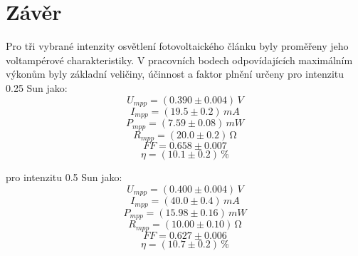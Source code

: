 \documentclass{../concepts/prepareprotokol} %
\begin{document}
\section{Závěr}

Pro tři vybrané intenzity osvětlení fotovoltaického článku byly proměřeny jeho voltampérové charakteristiky. V pracovních bodech odpovídajících maximálním výkonům byly základní veličiny, účinnost a faktor plnění určeny pro intenzitu 0.25 Sun jako:
\begin{equation*}
    U_{mpp} = (0.390 \pm 0.004) \, \si{V}
\end{equation*}
\begin{equation*}
    I_{mpp} = (19.5 \pm 0.2) \, \si{mA}
\end{equation*}
\begin{equation*}
    P_{mpp} = (7.59 \pm 0.08) \, \si{mW}
\end{equation*}
\begin{equation*}
    R_{mpp} = (20.0 \pm 0.2) \, \si{\ohm}
\end{equation*}
\begin{equation*}
    FF = 0.658 \pm 0.007
\end{equation*}
\begin{equation*}
    \eta = (10.1 \pm 0.2)\,\%
\end{equation*}

pro intenzitu 0.5 Sun jako:
\begin{equation*}
    U_{mpp} = (0.400 \pm 0.004) \, \si{V}
\end{equation*}
\begin{equation*}
    I_{mpp} = (40.0 \pm 0.4) \, \si{mA}
\end{equation*}
\begin{equation*}
    P_{mpp} = (15.98 \pm 0.16) \, \si{mW}
\end{equation*}
\begin{equation*}
    R_{mpp} = (10.00 \pm 0.10) \, \si{\ohm}
\end{equation*}
\begin{equation*}
    FF = 0.627 \pm 0.006
\end{equation*}
\begin{equation*}
    \eta = (10.7 \pm 0.2)\,\%
\end{equation*}
    
\end{document}
